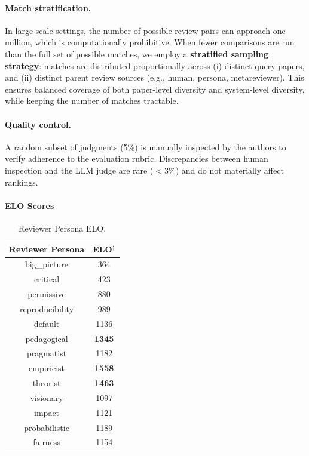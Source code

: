 \documentclass{article} %
\newcommand{\shrink}[1][0.5]{\vspace{-#1\baselineskip}}
\begin{document}
\paragraph{Match stratification.} \shrink[.75] 
In large-scale settings, the number of possible review pairs can approach one million, which is computationally prohibitive. When fewer comparisons are run than the full set of possible matches, we employ a \textbf{stratified sampling strategy}: matches are distributed proportionally across (i) distinct query papers, and (ii) distinct parent review sources (e.g., human, persona, metareviewer). This ensures balanced coverage of both paper-level diversity and system-level diversity, while keeping the number of matches tractable.

\paragraph{Quality control.} \shrink[.75] 
A random subset of judgments (5\%) is manually inspected by the authors to verify adherence to the evaluation rubric. Discrepancies between human inspection and the LLM judge are rare ($<3\%$) and do not materially affect rankings.

\paragraph{ELO Scores}
\begin{table}
\centering
\caption{Reviewer Persona ELO.}
\label{tab:reviewer_elo}
\begin{tabular}{cc}
\toprule
\textbf{Reviewer Persona} & \textbf{ELO}$^{\uparrow}$ \\
\midrule
big\_picture & 364 \\
critical & 423 \\
permissive & 880 \\
reproducibility & 989 \\
default & 1136 \\
pedagogical & \textbf{1345} \\
pragmatist & 1182 \\
empiricist & \textbf{1558} \\
theorist & \textbf{1463} \\
visionary & {1097} \\
impact & {1121} \\
probabilistic & {1189} \\
fairness & {1154} \\
\bottomrule
\end{tabular}
\end{table}
\end{document}
